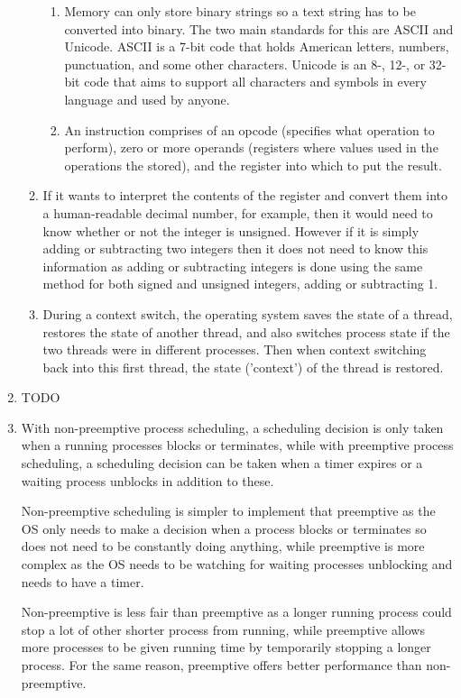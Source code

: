 \documentclass[12pt]{article}
\begin{document}
\begin{enumerate}
\begin{enumerate}
\begin{enumerate}
                        \item Memory can only store binary strings so a text string has to be converted into binary. The two main standards for this are ASCII and Unicode. ASCII is a 7-bit code that holds American letters, numbers, punctuation, and some other characters. Unicode is an 8-, 12-, or 32-bit code that aims to support all characters and symbols in every language and used by anyone.
                        \item An instruction comprises of an opcode (specifies what operation to perform), zero or more operands (registers where values used in the operations the stored), and the register into which to put the result.
                    \end{enumerate}
              \item If it wants to interpret the contents of the register and convert them into a human-readable decimal number, for example, then it would need to know whether or not the integer is unsigned. However if it is simply adding or subtracting two integers then it does not need to know this information as adding or subtracting integers is done using the same method for both signed and unsigned integers, adding or subtracting 1.
              \item During a context switch, the operating system saves the state of a thread, restores the state of another thread, and also switches process state if the two threads were in different processes. Then when context switching back into this first thread, the state ('context') of the thread is restored.
          \end{enumerate}
    \item TODO
    \item With non-preemptive process scheduling, a scheduling decision is only taken when a running processes blocks or terminates, while with preemptive process scheduling, a scheduling decision can be taken when a timer expires or a waiting process unblocks in addition to these.

          Non-preemptive scheduling is simpler to implement that preemptive as the OS only needs to make a decision when a process blocks or terminates so does not need to be constantly doing anything, while preemptive is more complex as the OS needs to be watching for waiting processes unblocking and needs to have a timer.

          Non-preemptive is less fair than preemptive as a longer running process could stop a lot of other shorter process from running, while preemptive allows more processes to be given running time by temporarily stopping a longer process. For the same reason, preemptive offers better performance than non-preemptive.


\end{enumerate}
\end{document}
